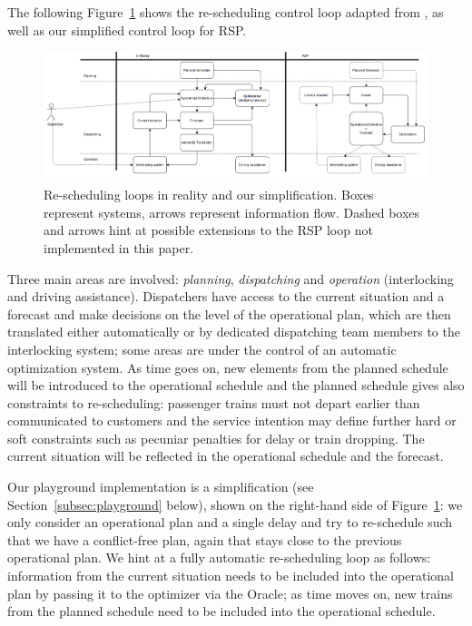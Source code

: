 \documentclass{article}
\begin{document}
The following Figure~\ref{fig:introduction_operations} shows the re-scheduling control loop adapted from \cite{rcsbrochure,rcswhitepaper}, as well as our simplified control loop for RSP.
%
\begin{figure}[hbtp]
	\centering
  \includegraphics[width=1.0\textwidth]{introduction_operations.PNG}
	\caption{Re-scheduling loops in reality and our simplification. Boxes represent systems, arrows represent information flow. Dashed boxes and arrows hint at possible extensions to the RSP loop not implemented in this paper.}
	\label{fig:introduction_operations}
\end{figure}
%
Three main areas are involved: \emph{planning}, \emph{dispatching} and \emph{operation} (interlocking and driving assistance). Dispatchers have access to the current situation and a forecast and make decisions on the level of the operational plan, which are then translated either automatically or by dedicated dispatching team members to the interlocking system; some areas are under the control of an automatic optimization system. As time goes on, new elements from the planned schedule will be introduced to the operational schedule and the planned schedule gives also constraints to re-scheduling: passenger trains must not depart earlier than communicated to customers and the service intention may define further hard or soft constraints such as pecuniar penalties for delay or train dropping. The current situation will be reflected in the operational schedule and the forecast.


Our playground implementation is a simplification (see Section~\ref{subsec:playground} below), shown on the right-hand side of Figure~\ref{fig:introduction_operations}: we only consider an operational plan and a single delay and try to re-schedule such that we have a conflict-free plan, again that stays close to the previous operational plan. We hint at a fully automatic re-scheduling loop as follows: information from the current situation needs to be included into the operational plan by passing it to the optimizer via the Oracle; as time moves on, new trains from the planned schedule need to be included into the operational schedule.
\end{document}
